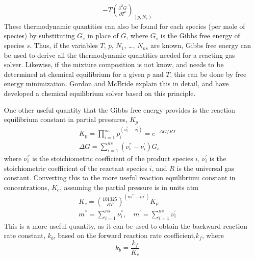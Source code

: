 \documentclass[a4paper]{article}
\newcommand{\pnd}[3]{\frac{\partial^{#3} #1}{\partial #2^{#3}}}
\begin{document}
\begin{enumerate}
\begin{gather}
{      - T\left( \pnd{G}{T}{2} \right)_{(p,N_s)}}
      \label{cp-def} \end{gather}
    These thermodynamic quantities can also be found for each species (per mole
    of species) by substituting $G_s$ in place of $G$, where $G_s$ is the Gibbs
    free energy of species $s$.  Thus, if the variables $T$, $p$, $N_1$, \dots,
    $N_{ns}$ are known, Gibbs free energy can be used to derive all the
    thermodynamic quantities needed for a reacting gas solver.  Likewise, if the
    mixture composition is not know, and needs to be determined at chemical
    equilibrium for a given $p$ and $T$, this can be done by free energy
    minimization.  Gordon and McBride\cite{mcbride} explain this in detail, and
    have developed a chemical equilibrium solver based on this principle.
    
    One other useful quantity that the Gibbs free energy provides is the
    reaction equilibrium constant in partial pressures, $K_p$
    \begin{gather}
      \boxed{K_p = \prod_{i=1}^{ns}{p_i^{(\nu_i^{''}-\nu_i^{'})}}
      = e^{-\Delta G /RT}} \label{kp-def} \\
      \boxed{\Delta G = \sum\limits_{i=1}^{ns}{\left(\nu_{i}^{''} -
      \nu_{i}^{'}\right) G_i}} \label{del-g-def}
    \end{gather}
    where $\nu_i^{''}$ is the stoichiometric coefficient of the product species
    $i$, $\nu_i^{'}$ is the stoichiometric coefficient of the reactant species
    $i$, and $R$ is the universal gas constant.  Converting this to the more
    useful reaction equilibrium constant in concentrations, $K_c$, assuming the
    partial pressure is in units atm
    \begin{equation}
      \begin{gathered}
        K_c = \left( \frac{101325}{RT} \right)^{(m^{''}-m^{'})} K_p \\
        m^{''} = \sum\limits_{i=1}^{ns}{\nu_i^{''}}, \quad
        m^{'} = \sum\limits_{i=1}^{ns}{\nu_i^{'}}
      \end{gathered}
      \label{kc-def}
    \end{equation}
    This is a more useful quantity, as it can be used to obtain the backward
    reaction rate constant, $k_b$, based on the forward reaction rate
    coefficient,$k_f$, where
    \begin{equation}
      k_b = \frac{k_f}{K_c}
      \label{kb-def}
    \end{equation}





\end{enumerate}
\end{document}
